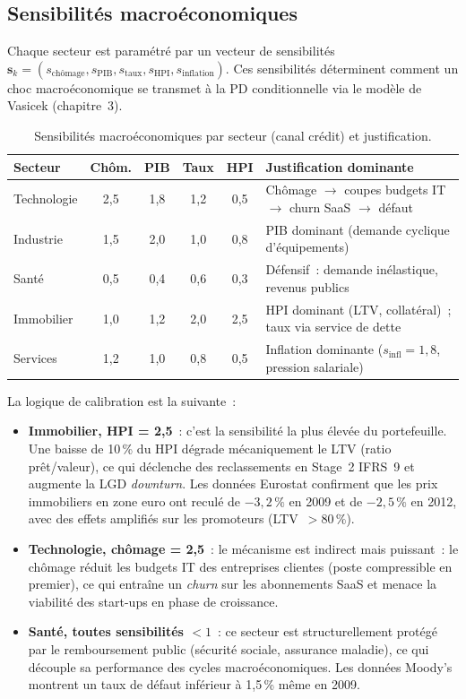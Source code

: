 \documentclass[12pt, a4paper, twoside, openright]{report}
\theoremstyle{definition}
\begin{document}
\subsection{Sensibilités macroéconomiques}

Chaque secteur est paramétré par un vecteur de sensibilités $\mathbf{s}_k = (s_{\text{chômage}}, s_{\text{PIB}}, s_{\text{taux}}, s_{\text{HPI}}, s_{\text{inflation}})$.
Ces sensibilités déterminent comment un choc macroéconomique se transmet à la PD conditionnelle via le modèle de Vasicek (chapitre~3).

\begin{table}[htbp]
\centering
\caption{Sensibilités macroéconomiques par secteur (canal crédit) et justification.}
\label{tab:sensibilites_credit}
\begin{tabular}{lccccp{4.5cm}}
\toprule
Secteur & Chôm. & PIB & Taux & HPI & Justification dominante \\
\midrule
Technologie & 2{,}5 & 1{,}8 & 1{,}2 & 0{,}5 & Chômage $\to$ coupes budgets IT $\to$ churn SaaS $\to$ défaut \\
Industrie   & 1{,}5 & 2{,}0 & 1{,}0 & 0{,}8 & PIB dominant (demande cyclique d'équipements) \\
Santé       & 0{,}5 & 0{,}4 & 0{,}6 & 0{,}3 & Défensif~: demande inélastique, revenus publics \\
Immobilier  & 1{,}0 & 1{,}2 & 2{,}0 & 2{,}5 & HPI dominant (LTV, collatéral)~; taux via service de dette \\
Services    & 1{,}2 & 1{,}0 & 0{,}8 & 0{,}5 & Inflation dominante ($s_{\text{infl}} = 1{,}8$, pression salariale) \\
\bottomrule
\end{tabular}
\end{table}

La logique de calibration est la suivante~:
\begin{itemize}[nosep]
  \item \textbf{Immobilier, HPI = 2{,}5}~: c'est la sensibilité la plus élevée du portefeuille. Une baisse de 10\,\% du HPI dégrade mécaniquement le LTV (ratio prêt/valeur), ce qui déclenche des reclassements en Stage~2 IFRS~9 et augmente la LGD \textit{downturn}. Les données Eurostat confirment que les prix immobiliers en zone euro ont reculé de $-3{,}2\,\%$ en 2009 et de $-2{,}5\,\%$ en 2012, avec des effets amplifiés sur les promoteurs (LTV~$> 80\,\%$).
  \item \textbf{Technologie, chômage = 2{,}5}~: le mécanisme est indirect mais puissant~: le chômage réduit les budgets IT des entreprises clientes (poste compressible en premier), ce qui entraîne un \emph{churn} sur les abonnements SaaS et menace la viabilité des start-ups en phase de croissance.
  \item \textbf{Santé, toutes sensibilités $< 1$}~: ce secteur est structurellement protégé par le remboursement public (sécurité sociale, assurance maladie), ce qui découple sa performance des cycles macroéconomiques. Les données Moody's montrent un taux de défaut inférieur à 1{,}5\,\% même en 2009.
\end{itemize}
\end{document}
